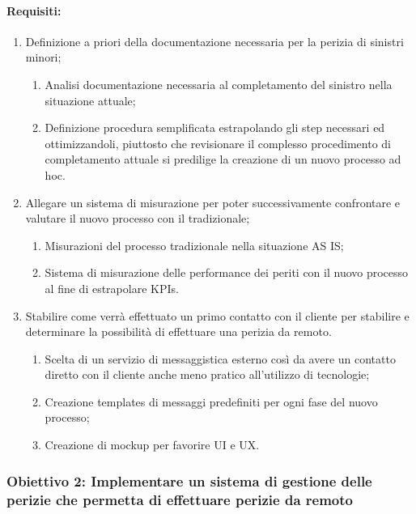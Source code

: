 \documentclass[a4paper,12pt, openright]{report}
\begin{document}
\paragraph{Requisiti:}
\begin{enumerate}
    \item Definizione a priori della documentazione necessaria per la perizia di sinistri minori;
    \begin{enumerate}
        \item Analisi documentazione necessaria al completamento del sinistro nella situazione attuale;
        \item Definizione procedura semplificata estrapolando gli step necessari ed ottimizzandoli, piuttosto che revisionare il complesso procedimento di completamento attuale si predilige la creazione di un nuovo processo ad hoc. 
    \end{enumerate}
    \item Allegare un sistema di misurazione per poter successivamente confrontare e valutare il nuovo processo con il tradizionale;
        \begin{enumerate}
        \item Misurazioni del processo tradizionale nella situazione AS IS;
        \item Sistema di misurazione delle performance dei periti con il nuovo processo al fine di estrapolare KPIs.
    \end{enumerate}
    \item Stabilire come verrà effettuato un primo contatto con il cliente per stabilire e determinare la possibilità di effettuare una perizia da remoto.
        \begin{enumerate}
        \item Scelta di un servizio di messaggistica esterno così da avere un contatto diretto con il cliente anche meno pratico all'utilizzo di tecnologie;
        \item Creazione templates di messaggi predefiniti per ogni fase del nuovo processo;
        \item Creazione di mockup per favorire UI e UX.
    \end{enumerate}
\end{enumerate}

\subsubsection{Obiettivo 2: Implementare un sistema di gestione delle perizie che permetta di effettuare perizie da remoto}
\end{document}
